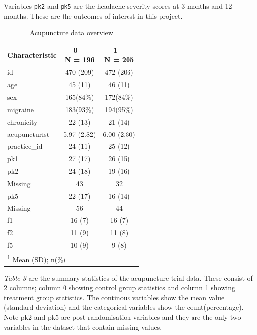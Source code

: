 \documentclass{article}
\begin{document}
Variables \texttt{pk2} and \texttt{pk5} are the headache severity scores
at 3 months and 12 months. These are the outcomes of interest in this
project.

\begin{table}[!h]
\centering
\caption{Acupuncture data overview}
\centering
\begin{tabular}[t]{l|c|c}
\hline
\textbf{Characteristic} & \makecell[c]{\textbf{0}\ \ \\N = 196} & \makecell[c]{\textbf{1}\ \ \\N = 205}\\
\hline
id & 470 (209) & 472 (206)\\
\hline
age & 45 (11) & 46 (11)\\
\hline
sex & 165(84\%) & 172(84\%)\\
\hline
migraine & 183(93\%) & 194(95\%)\\
\hline
chronicity & 22 (13) & 21 (14)\\
\hline
acupuncturist & 5.97 (2.82) & 6.00 (2.80)\\
\hline
practice\_id & 24 (11) & 25 (12)\\
\hline
pk1 & 27 (17) & 26 (15)\\
\hline
pk2 & 24 (18) & 19 (16)\\
\hline
\hspace{1em}Missing & 43 & 32\\
\hline
pk5 & 22 (17) & 16 (14)\\
\hline
\hspace{1em}Missing & 56 & 44\\
\hline
f1 & 16 (7) & 16 (7)\\
\hline
f2 & 11 (9) & 11 (8)\\
\hline
f5 & 10 (9) & 9 (8)\\
\hline
\multicolumn{3}{l}{\rule{0pt}{1em}\textsuperscript{1} Mean (SD); n(\%)}\\
\end{tabular}
\end{table}

\emph{Table 3} are the summary statistics of the acupuncture trial data.
These consist of 2 columns; column 0 showing control group statistics
and column 1 showing treatment group statistics. The continous variables
show the mean value (standard deviation) and the categorical variables
show the count(percentage). Note pk2 and pk5 are post randomisation
variables and they are the only two variables in the dataset that
contain missing values.
\end{document}
